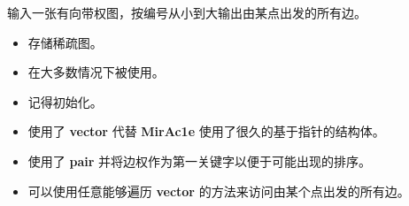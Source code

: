 \noindent 输入一张有向带权图，按编号从小到大输出由某点出发的所有边。

\begin{itemize}
    \item 存储稀疏图。
    \item 在大多数情况下被使用。
    \item 记得初始化。
    \item 使用了 \textbf{vector} 代替 \textbf{MirAc1e} 使用了很久的基于指针的结构体。
    \item 使用了 \textbf{pair} 并将边权作为第一关键字以便于可能出现的排序。
    \item 可以使用任意能够遍历 \textbf{vector} 的方法来访问由某个点出发的所有边。
\end{itemize}